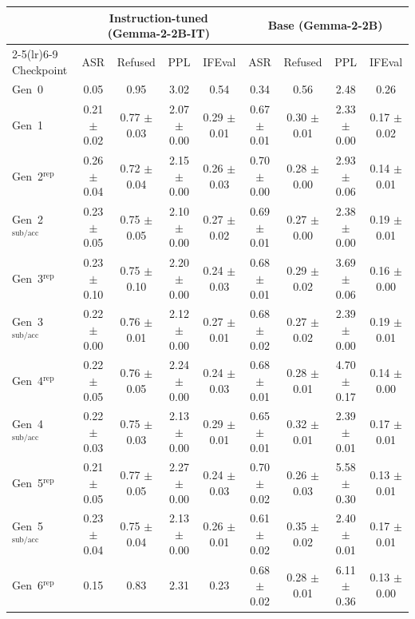 \begin{tabular}{lcccccccc}
\toprule
 & \multicolumn{4}{c}{Instruction-tuned (Gemma-2-2B-IT)} & \multicolumn{4}{c}{Base (Gemma-2-2B)} \\
\cmidrule(lr){2-5}\cmidrule(lr){6-9}
Checkpoint & ASR & Refused & PPL & IFEval & ASR & Refused & PPL & IFEval \\
\midrule
Gen~0 & 0.05 & 0.95 & 3.02 & 0.54 & 0.34 & 0.56 & 2.48 & 0.26 \\
Gen~1 & 0.21 $\pm$ 0.02 & 0.77 $\pm$ 0.03 & 2.07 $\pm$ 0.00 & 0.29 $\pm$ 0.01 & 0.67 $\pm$ 0.01 & 0.30 $\pm$ 0.01 & 2.33 $\pm$ 0.00 & 0.17 $\pm$ 0.02 \\
\addlinespace[1pt]
Gen~2$^{\mathrm{rep}}$ & 0.26 $\pm$ 0.04 & 0.72 $\pm$ 0.04 & 2.15 $\pm$ 0.00 & 0.26 $\pm$ 0.03 & 0.70 $\pm$ 0.00 & 0.28 $\pm$ 0.00 & 2.93 $\pm$ 0.06 & 0.14 $\pm$ 0.01 \\
Gen~2$^{\mathrm{sub/acc}}$ & 0.23 $\pm$ 0.05 & 0.75 $\pm$ 0.05 & 2.10 $\pm$ 0.00 & 0.27 $\pm$ 0.02 & 0.69 $\pm$ 0.01 & 0.27 $\pm$ 0.00 & 2.38 $\pm$ 0.00 & 0.19 $\pm$ 0.01 \\
\addlinespace[1pt]
Gen~3$^{\mathrm{rep}}$ & 0.23 $\pm$ 0.10 & 0.75 $\pm$ 0.10 & 2.20 $\pm$ 0.00 & 0.24 $\pm$ 0.03 & 0.68 $\pm$ 0.01 & 0.29 $\pm$ 0.02 & 3.69 $\pm$ 0.06 & 0.16 $\pm$ 0.00 \\
Gen~3$^{\mathrm{sub/acc}}$ & 0.22 $\pm$ 0.00 & 0.76 $\pm$ 0.01 & 2.12 $\pm$ 0.00 & 0.27 $\pm$ 0.01 & 0.68 $\pm$ 0.02 & 0.27 $\pm$ 0.02 & 2.39 $\pm$ 0.00 & 0.19 $\pm$ 0.01 \\
\addlinespace[1pt]
Gen~4$^{\mathrm{rep}}$ & 0.22 $\pm$ 0.05 & 0.76 $\pm$ 0.05 & 2.24 $\pm$ 0.00 & 0.24 $\pm$ 0.03 & 0.68 $\pm$ 0.01 & 0.28 $\pm$ 0.01 & 4.70 $\pm$ 0.17 & 0.14 $\pm$ 0.00 \\
Gen~4$^{\mathrm{sub/acc}}$ & 0.22 $\pm$ 0.03 & 0.75 $\pm$ 0.03 & 2.13 $\pm$ 0.00 & 0.29 $\pm$ 0.01 & 0.65 $\pm$ 0.01 & 0.32 $\pm$ 0.01 & 2.39 $\pm$ 0.01 & 0.17 $\pm$ 0.01 \\
\addlinespace[1pt]
Gen~5$^{\mathrm{rep}}$ & 0.21 $\pm$ 0.05 & 0.77 $\pm$ 0.05 & 2.27 $\pm$ 0.00 & 0.24 $\pm$ 0.03 & 0.70 $\pm$ 0.02 & 0.26 $\pm$ 0.03 & 5.58 $\pm$ 0.30 & 0.13 $\pm$ 0.01 \\
Gen~5$^{\mathrm{sub/acc}}$ & 0.23 $\pm$ 0.04 & 0.75 $\pm$ 0.04 & 2.13 $\pm$ 0.00 & 0.26 $\pm$ 0.01 & 0.61 $\pm$ 0.02 & 0.35 $\pm$ 0.02 & 2.40 $\pm$ 0.01 & 0.17 $\pm$ 0.01 \\
\addlinespace[1pt]
Gen~6$^{\mathrm{rep}}$ & 0.15 & 0.83 & 2.31 & 0.23 & 0.68 $\pm$ 0.02 & 0.28 $\pm$ 0.01 & 6.11 $\pm$ 0.36 & 0.13 $\pm$ 0.00 \\

\end{tabular}
